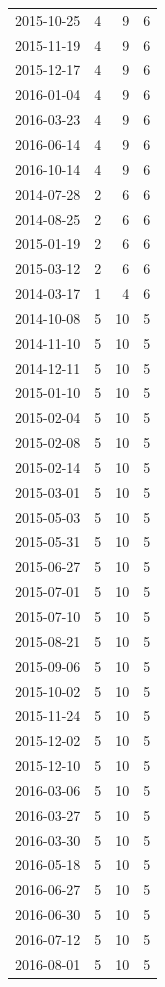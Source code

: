 \begin{tabular}{lrrr}
2015-10-25 & 4 & 9 & 6 \\
2015-11-19 & 4 & 9 & 6 \\
2015-12-17 & 4 & 9 & 6 \\
2016-01-04 & 4 & 9 & 6 \\
2016-03-23 & 4 & 9 & 6 \\
2016-06-14 & 4 & 9 & 6 \\
2016-10-14 & 4 & 9 & 6 \\
2014-07-28 & 2 & 6 & 6 \\
2014-08-25 & 2 & 6 & 6 \\
2015-01-19 & 2 & 6 & 6 \\
2015-03-12 & 2 & 6 & 6 \\
2014-03-17 & 1 & 4 & 6 \\
2014-10-08 & 5 & 10 & 5 \\
2014-11-10 & 5 & 10 & 5 \\
2014-12-11 & 5 & 10 & 5 \\
2015-01-10 & 5 & 10 & 5 \\
2015-02-04 & 5 & 10 & 5 \\
2015-02-08 & 5 & 10 & 5 \\
2015-02-14 & 5 & 10 & 5 \\
2015-03-01 & 5 & 10 & 5 \\
2015-05-03 & 5 & 10 & 5 \\
2015-05-31 & 5 & 10 & 5 \\
2015-06-27 & 5 & 10 & 5 \\
2015-07-01 & 5 & 10 & 5 \\
2015-07-10 & 5 & 10 & 5 \\
2015-08-21 & 5 & 10 & 5 \\
2015-09-06 & 5 & 10 & 5 \\
2015-10-02 & 5 & 10 & 5 \\
2015-11-24 & 5 & 10 & 5 \\
2015-12-02 & 5 & 10 & 5 \\
2015-12-10 & 5 & 10 & 5 \\
2016-03-06 & 5 & 10 & 5 \\
2016-03-27 & 5 & 10 & 5 \\
2016-03-30 & 5 & 10 & 5 \\
2016-05-18 & 5 & 10 & 5 \\
2016-06-27 & 5 & 10 & 5 \\
2016-06-30 & 5 & 10 & 5 \\
2016-07-12 & 5 & 10 & 5 \\
2016-08-01 & 5 & 10 & 5 \\

\end{tabular}
